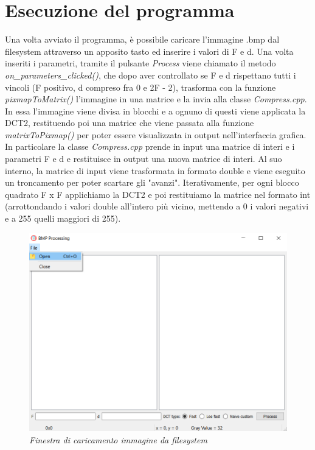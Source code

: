 \documentclass[a4paper,12pt]{report}
\begin{document}
\section{Esecuzione del programma}
Una volta avviato il programma, è possibile caricare l'immagine .bmp dal filesystem attraverso un apposito tasto ed inserire i valori di F e d. Una volta inseriti i parametri, tramite il pulsante \textit{Process} viene chiamato il metodo \textit{on\_parameters\_clicked()}, che dopo aver controllato se F e d rispettano tutti i vincoli (F positivo, d compreso fra 0 e 2F - 2), trasforma con la funzione \textit{pixmapToMatrix()} l'immagine in una matrice e la invia alla classe \textit{Compress.cpp}. In essa l'immagine viene divisa in blocchi e a ognuno di questi viene applicata la DCT2, restituendo poi una matrice che viene passata alla funzione \textit{matrixToPixmap()} per poter essere visualizzata in output nell'interfaccia grafica.\\
In particolare la classe \textit{Compress.cpp} prende in input una matrice di interi e i parametri F e d e restituisce in output una nuova matrice di interi. Al suo interno, la matrice di input viene trasformata in formato double e viene eseguito un troncamento per poter scartare gli "avanzi". Iterativamente, per ogni blocco quadrato F x F applichiamo la DCT2 e poi restituiamo la matrice nel formato int (arrottondando i valori double all'intero più vicino, mettendo a 0 i valori negativi e a 255 quelli maggiori di 255). 

\begin{figure}[H]
\centering
\includegraphics[width=0.8\linewidth]{../img/open.png}
\caption{\textit{Finestra di caricamento immagine da filesystem}}
\end{figure}
\end{document}
